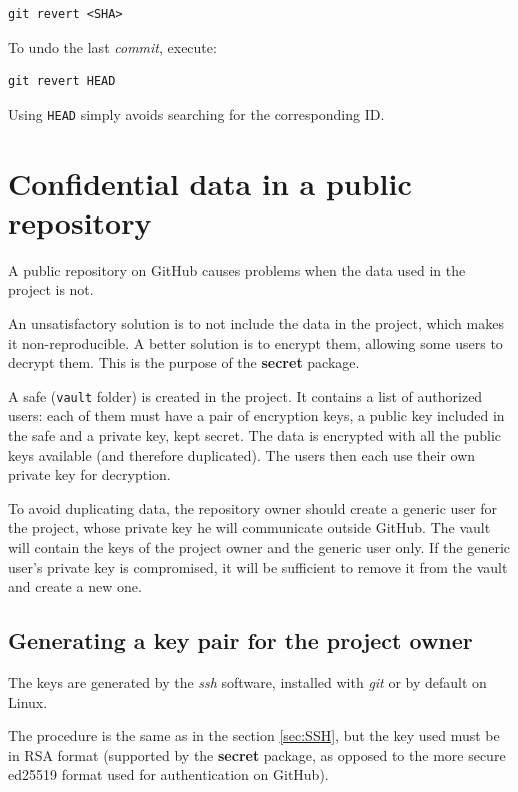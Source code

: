 \documentclass[
  12pt,
  american,
  a4paper,
  extrafontsizes,onecolumn,openright
  ]{memoir}
\begin{document}
\begin{verbatim}
git revert <SHA>
\end{verbatim}

To undo the last \emph{commit}, execute:

\begin{verbatim}
git revert HEAD
\end{verbatim}

Using \texttt{HEAD} simply avoids searching for the corresponding ID.

\hypertarget{sec:confidential}{%
\section{Confidential data in a public repository}\label{sec:confidential}}

A public repository on GitHub causes problems when the data used in the project is not.

An unsatisfactory solution is to not include the data in the project, which makes it non-reproducible.
A better solution is to encrypt them, allowing some users to decrypt them.
This is the purpose of the \textbf{secret} package.

A safe (\texttt{vault} folder) is created in the project.
It contains a list of authorized users: each of them must have a pair of encryption keys, a public key included in the safe and a private key, kept secret.
The data is encrypted with all the public keys available (and therefore duplicated).
The users then each use their own private key for decryption.

To avoid duplicating data, the repository owner should create a generic user for the project, whose private key he will communicate outside GitHub.
The vault will contain the keys of the project owner and the generic user only.
If the generic user's private key is compromised, it will be sufficient to remove it from the vault and create a new one.

\hypertarget{generating-a-key-pair-for-the-project-owner}{%
\subsection{Generating a key pair for the project owner}\label{generating-a-key-pair-for-the-project-owner}}

The keys are generated by the \emph{ssh} software, installed with \emph{git} or by default on Linux.

The procedure is the same as in the section \ref{sec:SSH}, but the key used must be in RSA format (supported by the \textbf{secret} package, as opposed to the more secure ed25519 format used for authentication on GitHub).
\end{document}
